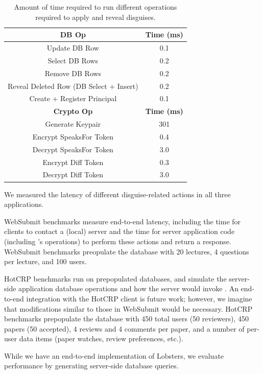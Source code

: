 \begin{table}[h!]
\begin{center}
\begin{tabular}{ c c }
\hline
\textbf{DB Op} & \textbf{Time (ms)}\\
\hline
Update DB Row & 0.1\\ 
Select DB Rows & 0.2\\
Remove DB Rows & 0.2\\
Reveal Deleted Row (DB Select + Insert) & 0.2 \\
Create + Register Principal & 0.1\\
\hline
\textbf{Crypto Op} & \textbf{Time (ms)}\\
\hline
Generate Keypair & 301\\
Encrypt SpeaksFor Token & 0.4\\
Decrypt SpeaksFor Token & 3.0\\
Encrypt Diff Token & 0.3\\
Decrypt Diff Token & 3.0\\
\end{tabular}
\end{center}
\caption{Amount of time required to run different operations required to apply and reveal disguises.}
\label{tab:opstats}
\end{table}

We measured the latency of different disguise-related actions in all three applications.

WebSubmit benchmarks measure end-to-end latency, including the time for clients to contact a (local)
server and the time for server application code (including \sys's operations) to perform these
actions and return a response.
%
WebSubmit benchmarks preopulate the database with 20 lectures, 4 questions per lecture, and 100
users.

HotCRP benchmarks run on prepopulated databases, and simulate the server-side application database
operations and how the server would invoke \sys.  An end-to-end integration with the HotCRP client
is future work; however, we imagine that modifications similar to those in WebSubmit would be
necessary.
%
HotCRP benchmarks prepopulate the database with 450 total users (50 reviewers), 450 papers (50
accepted), 4 reviews and 4 comments per paper, and a number of per-user data items (\eg paper
watches, review preferences, etc.).  

While we have an end-to-end implementation of Lobsters, we evaluate performance by generating
server-side database queries.

